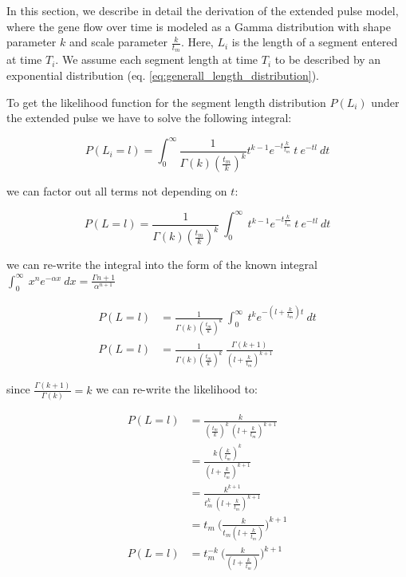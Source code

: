 \documentclass[]{article}
\begin{document}
In this section, we describe in detail the derivation of the extended pulse model, where the gene flow over time is modeled as a Gamma distribution with shape parameter $k$ and scale parameter $\frac{k}{t_m}$. Here, $L_i$ is the length of a segment entered at time $T_i$. We assume each segment length at time $T_i$ to be described by an exponential distribution (eq. \ref{eq:generall_length_distribution}).

To get the likelihood function for the segment length distribution $P(L_i)$ under the extended pulse we have to solve the following integral:

\begin{equation}
\label{eq:Likelihood_function_extended_pulse_1}
    P(L_i=l) = \int_{0}^{\infty} \frac{1}{\Gamma(k)(\frac{t_m}{k})^k}t^{k-1}e^{-t\frac{k}{t_m}}\ t\ e^{-tl} \ dt 
\end{equation}

we can factor out all terms not depending on $t$:

\begin{equation}
\label{eq:Likelihood_function_extended_pulse_2}
    P(L=l) = \frac{1}{\Gamma(k)(\frac{t_m}{k})^k}\ \int_{0}^{\infty}\ t^{k-1}e^{-t\frac{k}{t_m}}\ t\ e^{-tl} \ dt 
\end{equation}

 
we can re-write the integral into the  form of the known integral $\int_{0}^{\infty}\ x^n e^{-\alpha x} \ dx= \frac{\Gamma{n+1}}{\alpha^{n+1}}$

\begin{equation}
\begin{split}
\label{eq:Likelihood_function_extended_pulse_3}
    P(L=l) &= \frac{1}{\Gamma(k)(\frac{t_m}{k})^k}\ \int_{0}^{\infty}\ t^{k}e^{-(l+\frac{k}{t_m})t} \ dt \\ 
    P(L=l) &= \frac{1}{\Gamma(k)(\frac{t_m}{k})^k}\ \frac{\Gamma(k+1)}{(l+\frac{k}{t_m})^{k+1}} 
\end{split}
\end{equation}

since $\frac{\Gamma(k+1)}{\Gamma(k)} =k$ we can re-write the likelihood to:



\begin{equation}
\begin{split}
\label{eq:Likelihood_function_extended_pulse_final}
    P(L=l) &= \frac{k}{(\frac{t_m}{k})^k \ (l+\frac{k}{t_m})^{k+1}} \\
    &= \frac{k(\frac{k}{t_m})^k} {(l+\frac{k}{t_{m}})^{k+1}}  \\
    &= \frac{k^{k+1}} { t_{m}^k \ (l+\frac{k}{t_{m}})^{k+1}}  \\
    &= t_{m} \ \Bigg( \frac{k}{t_{m}(l+\frac{k}{t_{m}})}\Bigg)^{k+1} \\
    P(L=l) &= t_{m}^{-k} \ \Bigg( \frac{k}{(l+\frac{k}{t_{m}})}\Bigg)^{k+1}
\end{split}
\end{equation}
\end{document}
